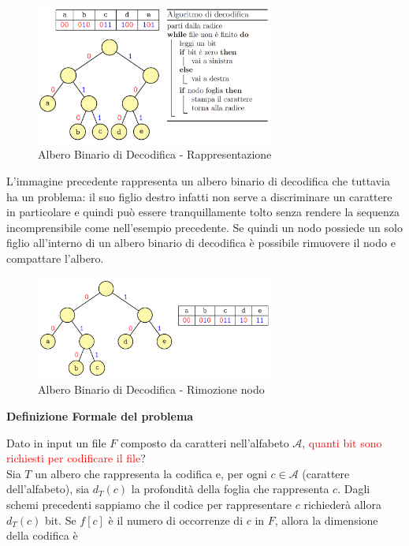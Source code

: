 \documentclass[../cheatSheetAlgoritmi.tex]{subfiles}
\begin{document}
\begin{figure}[h]
	\centering
	\includegraphics[width=0.7\textwidth]{../img/Greedy_2.png}
	\caption{Albero Binario di Decodifica - Rappresentazione}
\end{figure}
L'immagine precedente rappresenta un albero binario di decodifica che tuttavia ha un problema: il suo figlio destro infatti non serve a discriminare un carattere in particolare e quindi può essere tranquillamente tolto senza rendere la sequenza incomprensibile come nell'esempio precedente. Se quindi un nodo possiede un solo figlio all'interno di un albero binario di decodifica è possibile rimuovere il nodo e compattare l'albero.\\
\begin{figure}[h]
\centering
\includegraphics[width=0.7\textwidth]{../img/Greedy_3.png}
\caption{Albero Binario di Decodifica - Rimozione nodo}
\end{figure}
\newpage
\begin{flushleft}
\textbf{Definizione Formale del problema}
\end{flushleft}
Dato in input un file $F$ composto da caratteri nell'alfabeto $\mathcal{A}$, \textcolor{red}{quanti bit sono richiesti per codificare il file}?\\
Sia $T$ un albero che rappresenta la codifica e, per ogni $c \in \mathcal{A}$ (carattere dell'alfabeto), sia $d_{T}(c)$ la profondità della foglia che rappresenta $c$. Dagli schemi precedenti sappiamo che il codice per rappresentare $c$ richiederà allora $d_{T}(c)$ bit. Se $f[c]$ è il numero di occorrenze di $c$ in $F$, allora la dimensione della codifica è
\end{document}

